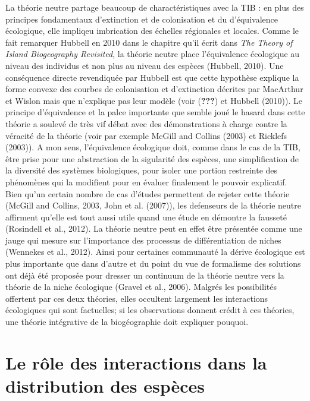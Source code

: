 La théorie neutre partage beaucoup de charactéristiques avec la TIB : en
plus des principes fondamentaux d'extinction et de colonisation et du
d'équivalence écologique, elle impliqeu imbrication des échelles
régionales et locales. Comme le fait remarquer Hubbell en 2010 dans le
chapitre qu'il écrit dans \emph{The Theory of Island Biogeography
Revisited}, la théorie neutre place l'équivalence écologique au niveau
des individus et non plus au niveau des espèces (Hubbell, 2010). Une
conséquence directe revendiquée par Hubbell est que cette hypothèse
explique la forme convexe des courbes de colonisation et d'extinction
décrites par MacArthur et Wislon mais que n'explique pas leur modèle
(voir ({\textbf{???}}) et Hubbell (2010)). Le principe d'équivalence et
la palce importante que semble joué le hasard dans cette théorie a
soulevé de très vif débat avec des démonstrations à charge contre la
véracité de la théorie (voir par exemple McGill and Collins (2003) et
Ricklefs (2003)). A mon sens, l'équivalence écologique doit, comme dans
le cas de la TIB, être prise pour une abstraction de la sigularité des
espèces, une simplification de la diversité des systèmes biologiques,
pour isoler une portion restreinte des phénomènes qui la modifient pour
en évaluer finalement le pouvoir explicatif. Bien qu'un certain nombre
de cas d'études permettent de rejeter cette théorie (McGill and Collins,
2003, John et al. (2007)), les defenseurs de la théorie neutre affirment
qu'elle est tout aussi utile quand une étude en démontre la fausseté
(Rosindell et al., 2012). La théorie neutre peut en effet être présentée
comme une jauge qui mesure sur l'importance des processus de
différentiation de niches (Wennekes et al., 2012). Ainsi pour certaines
communauté la dérive écologique est plus importante que dans d'autre et
du point du vue de formalisme des solutions ont déjà été proposée pour
dresser un continuum de la théorie neutre vers la théorie de la niche
écologique (Gravel et al., 2006). Malgrés les possibilités offertent par
ces deux théories, elles occultent largement les interactions
écologiques qui sont factuelles; si les observations donnent crédit à
ces théories, une théorie intégrative de la biogéographie doit expliquer
pouquoi.

\section*{Le rôle des interactions dans la distribution des
espèces}\label{le-ruxf4le-des-interactions-dans-la-distribution-des-espuxe8ces}


